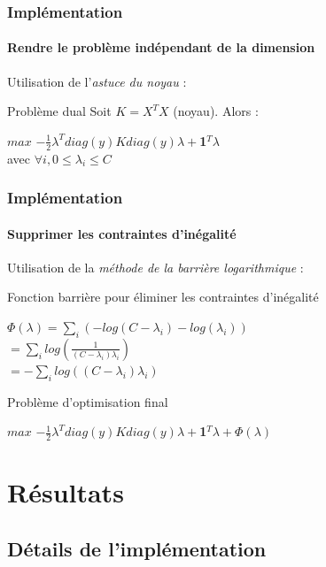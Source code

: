 \documentclass{beamer}
\begin{document}
\begin{frame}
\frametitle{Implémentation}
\framesubtitle{Rendre le problème indépendant de la dimension}

Utilisation de l'\emph{astuce du noyau} :

\begin{block}{Problème dual}
Soit $K = X^TX$ (noyau). Alors :
                 \begin{center}
                 $max$ $-\frac{1}{2}\lambda^Tdiag(y)Kdiag(y)\lambda+$\textbf{1}$^T\lambda$\\
                 avec $\forall i, 0 \leq \lambda_i \leq C$ 
                 \end{center}
\end{block}

\end{frame}

\begin{frame}
\frametitle{Implémentation}
\framesubtitle{Supprimer les contraintes d'inégalité}

Utilisation de la \emph{méthode de la barrière logarithmique} :

\begin{block}{Fonction barrière pour éliminer les contraintes d'inégalité}
          \begin{center}
          $\Phi(\lambda) = \sum_i (- log(C - \lambda_i) - log(\lambda_i))$\\
          $= \sum_i log(\frac{1}{(C - \lambda_i)\lambda_i})$\\
          $= - \sum_i log((C - \lambda_i)\lambda_i)$ 
          \end{center}
\end{block}

\begin{block}{Problème d'optimisation final}
          \begin{center}
          $max$ $-\frac{1}{2}\lambda^Tdiag(y)Kdiag(y)\lambda+$\textbf{1}$^T\lambda + \Phi(\lambda)$\\ 
          \end{center}
\end{block}

\end{frame}

\section{Résultats}

\subsection{Détails de l'implémentation}
\end{document}
